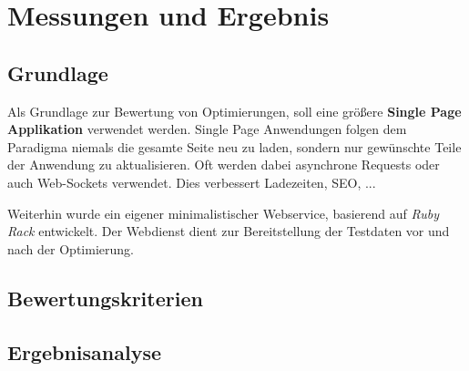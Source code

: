 \section{Messungen und Ergebnis}
\subsection{Grundlage}
Als Grundlage zur Bewertung von Optimierungen, soll eine größere \textbf{Single Page Applikation} verwendet werden. Single Page Anwendungen folgen dem Paradigma niemals die gesamte Seite neu zu laden, sondern nur gewünschte Teile der Anwendung zu aktualisieren. Oft werden dabei asynchrone Requests oder auch Web-Sockets verwendet. Dies verbessert Ladezeiten, SEO, ... 

Weiterhin wurde ein eigener minimalistischer Webservice, basierend auf \textit{Ruby Rack} entwickelt. Der Webdienst dient zur Bereitstellung der Testdaten vor und nach der Optimierung. 


\subsection{Bewertungskriterien}

\subsection{Ergebnisanalyse}